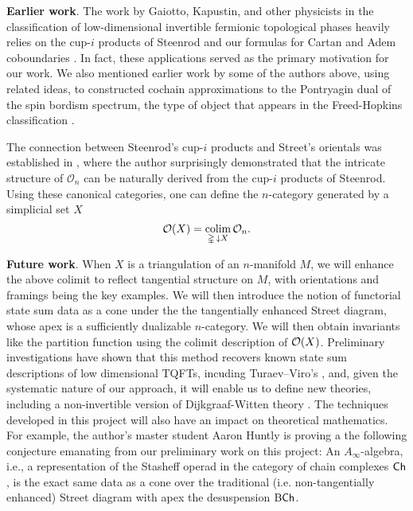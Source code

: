 \medskip\noindent\textbf{Earlier work}.
The work by Gaiotto, Kapustin, and other physicists in the classification of low-dimensional invertible fermionic topological phases \cite{gaiotto2016spin, barkeshli2021classification} heavily relies on the cup-$i$ products of Steenrod and our formulas for Cartan and Adem coboundaries \cite{medina2020cartan, medina2021adem}.
In fact, these applications served as the primary motivation for our work.
We also mentioned earlier work by some of the authors above, using related ideas, to constructed cochain approximations to the Pontryagin dual of the spin bordism spectrum, the type of object that appears in the Freed-Hopkins classification \cite{brumfiel2016pontrjagin, brumfiel2018pontrjagin}.

The connection between Steenrod's cup-$i$ products and Street's orientals was established in \cite{medina2020globular}, where the author surprisingly demonstrated that the intricate structure of $\mathcal{O}_n$ can be naturally derived from the cup-$i$ products of Steenrod.
Using these canonical categories, one can define the $n$-category generated by a simplicial set $X$
\begin{equation}\label{eq:colimit}
	\mathcal{O}(X) = \operatorname*{colim}_{\mathbb{\Delta}\, \downarrow X} \mathcal{O}_n.
\end{equation}

\medskip\noindent\textbf{Future work}.
When $X$ is a triangulation of an $n$-manifold $M$, we will enhance the above colimit to reflect tangential structure on $M$, with orientations and framings being the key examples.
We will then introduce the notion of functorial state sum data as a cone under the the tangentially enhanced Street diagram, whose apex is a sufficiently dualizable $n$-category.
We will then obtain invariants like the partition function using the colimit description of $\mathcal{O}(X)$.
Preliminary investigations have shown that this method recovers known state sum descriptions of low dimensional TQFTs, incuding Turaev--Viro's \cite{turaev1992invariants}, and, given the systematic nature of our approach, it will enable us to define new theories, including a non-invertible version of Dijkgraaf-Witten theory \cite{dijkgraaf1990topological}.
The techniques developed in this project will also have an impact on theoretical mathematics.
For example, the author's master student Aaron Huntly is proving a the following conjecture emanating from our preliminary work on this project: An $A_\infty$-algebra, i.e., a representation of the Stasheff operad in the category of chain complexes $\mathsf{Ch}$, is the exact same data as a cone over the traditional (i.e. non-tangentially enhanced) Street diagram with apex the desuspension $\mathrm{B}\mathsf{Ch}$.

